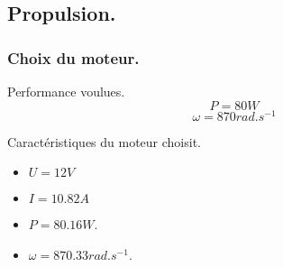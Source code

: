 \subsection{Propulsion.}
\begin{frame}
    \frametitle{Choix du moteur.}
    \begin{exampleblock}{Performance voulues.}
        \[ P = 80W \]
        \[ \omega = 870rad.s^{-1} \]
    \end{exampleblock}
     {
        \begin{block}{Caractéristiques du moteur choisit.}
            \begin{itemize}
                \item $U = 12V$
                \item $I = 10.82A$
                \item $P = 80.16W$.
                \item $\omega = 870.33rad.s^{-1}$.
            \end{itemize}
        \end{block}
    }
\end{frame}

